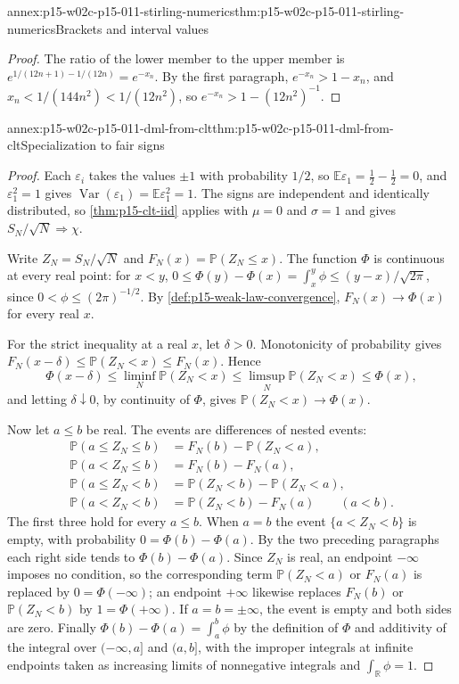 \begin{annexitem}{annex:p15-w02c-p15-011-stirling-numerics}{thm:p15-w02c-p15-011-stirling-numerics}{Brackets and interval values}
\begin{proof}
The ratio of the lower member to the upper member is
\(e^{1/(12n+1)-1/(12n)}=e^{-x_n}\). By the first paragraph,
\(e^{-x_n}>1-x_n\), and \(x_n<1/(144n^2)<1/(12n^2)\), so
\(e^{-x_n}>1-(12n^2)^{-1}\).
\end{proof}
\end{annexitem}

\begin{annexitem}{annex:p15-w02c-p15-011-dml-from-clt}{thm:p15-w02c-p15-011-dml-from-clt}{Specialization to fair signs}
\begin{proof}
Each \(\varepsilon_i\) takes the values \(\pm1\) with probability \(1/2\),
so \(\mathbb E\varepsilon_1=\tfrac12-\tfrac12=0\), and
\(\varepsilon_1^2=1\) gives
\(\operatorname{Var}(\varepsilon_1)=\mathbb E\varepsilon_1^2=1\). The signs
are independent and identically distributed, so \cref{thm:p15-clt-iid}
applies with \(\mu=0\) and \(\sigma=1\) and gives
\(S_N/\sqrt N\Rightarrow\chi\).

Write \(Z_N=S_N/\sqrt N\) and \(F_N(x)=\mathbb P(Z_N\leq x)\). The function
\(\Phi\) is continuous at every real point: for \(x<y\),
\(0\leq\Phi(y)-\Phi(x)=\int_x^y\phi\leq(y-x)/\sqrt{2\pi}\), since
\(0<\phi\leq(2\pi)^{-1/2}\). By \cref{def:p15-weak-law-convergence},
\(F_N(x)\to\Phi(x)\) for every real \(x\).

For the strict inequality at a real \(x\), let \(\delta>0\). Monotonicity
of probability gives
\(F_N(x-\delta)\leq\mathbb P(Z_N<x)\leq F_N(x)\). Hence
\[
 \Phi(x-\delta)\leq\liminf_{N}\mathbb P(Z_N<x)
   \leq\limsup_{N}\mathbb P(Z_N<x)\leq\Phi(x),
\]
and letting \(\delta\downarrow0\), by continuity of \(\Phi\), gives
\(\mathbb P(Z_N<x)\to\Phi(x)\).

Now let \(a\leq b\) be real. The events are differences of nested events:
\[
 \begin{aligned}
 \mathbb P(a\leq Z_N\leq b)&=F_N(b)-\mathbb P(Z_N<a),\\
 \mathbb P(a<Z_N\leq b)&=F_N(b)-F_N(a),\\
 \mathbb P(a\leq Z_N<b)&=\mathbb P(Z_N<b)-\mathbb P(Z_N<a),\\
 \mathbb P(a<Z_N<b)&=\mathbb P(Z_N<b)-F_N(a)\qquad(a<b).
 \end{aligned}
\]
The first three hold for every \(a\leq b\). When \(a=b\) the event
\(\{a<Z_N<b\}\) is empty, with probability \(0=\Phi(b)-\Phi(a)\). By the two preceding paragraphs each right
side tends to \(\Phi(b)-\Phi(a)\). Since \(Z_N\) is real, an endpoint
\(-\infty\) imposes no condition, so the corresponding term
\(\mathbb P(Z_N<a)\) or \(F_N(a)\) is replaced by \(0=\Phi(-\infty)\); an
endpoint \(+\infty\) likewise replaces \(F_N(b)\) or \(\mathbb P(Z_N<b)\) by
\(1=\Phi(+\infty)\). If \(a=b=\pm\infty\), the event is empty and both sides
are zero. Finally \(\Phi(b)-\Phi(a)=\int_a^b\phi\) by the definition of
\(\Phi\) and additivity of the integral over \((-\infty,a]\) and \((a,b]\),
with the improper integrals at infinite endpoints taken as increasing limits
of nonnegative integrals and \(\int_{\mathbb R}\phi=1\).
\end{proof}
\end{annexitem}

